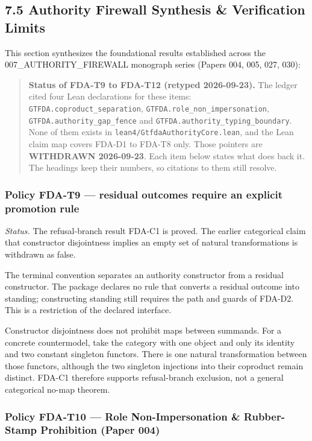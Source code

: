 \documentclass[
  11pt,
]{article}
\begin{document}
\subsection{7.5 Authority Firewall Synthesis \& Verification Limits}\label{authority-firewall-synthesis-verification-limits}

This section synthesizes the foundational results established across the 007\_AUTHORITY\_FIREWALL monograph series (Papers 004, 005, 027, 030):

\begin{quote}
\textbf{Status of FDA-T9 to FDA-T12 (retyped 2026-09-23).} The ledger cited four Lean declarations for these items: \nolinkurl{GTFDA.coproduct_separation}, \nolinkurl{GTFDA.role_non_impersonation}, \nolinkurl{GTFDA.authority_gap_fence} and \nolinkurl{GTFDA.authority_typing_boundary}. None of them exists in \nolinkurl{lean4/GtfdaAuthorityCore.lean}, and the Lean claim map covers FDA-D1 to FDA-T8 only. Those pointers are \textbf{WITHDRAWN 2026-09-23}. Each item below states what does back it. The headings keep their numbers, so citations to them still resolve.
\end{quote}

\subsubsection{Policy FDA-T9 --- residual outcomes require an explicit promotion rule}\label{policy-fda-t9-residual-outcomes-require-an-explicit-promotion-rule}

\emph{Status.} The refusal-branch result FDA-C1 is proved. The earlier categorical claim that constructor disjointness implies an empty set of natural transformations is withdrawn as false.

The terminal convention separates an authority constructor from a residual constructor. The package declares no rule that converts a residual outcome into standing; constructing standing still requires the path and guards of FDA-D2. This is a restriction of the declared interface.

Constructor disjointness does not prohibit maps between summands. For a concrete countermodel, take the category with one object and only its identity and two constant singleton functors. There is one natural transformation between those functors, although the two singleton injections into their coproduct remain distinct. FDA-C1 therefore supports refusal-branch exclusion, not a general categorical no-map theorem.

\subsubsection{Policy FDA-T10 --- Role Non-Impersonation \& Rubber-Stamp Prohibition (Paper 004)}\label{policy-fda-t10-role-non-impersonation-rubber-stamp-prohibition-paper-004}
\end{document}
